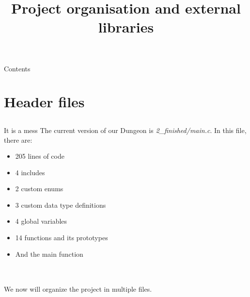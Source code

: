 
\newcommand{\topic}{
	Project organisation and external libraries
}

\title{\topic}
\supertitle{\course}
\date{}



\maketitle

\begin{frame}{Contents}
	\tableofcontents
\end{frame}

\section{Header files}
\subsection{}
\begin{frame}{It is a mess}
	The current version of our Dungeon is \textit{2\_finished/main.c}. In this file, there are:
	\begin{itemize}
		\item 205 lines of code
		\item 4 includes
		\item 2 custom enums
		\item 3 custom data type definitions
		\item 4 global variables
		\item 14 functions and its prototypes
		\item And the main function
	\end{itemize}\ \\\ \\
	We now will organize the project in multiple files.
\end{frame}

